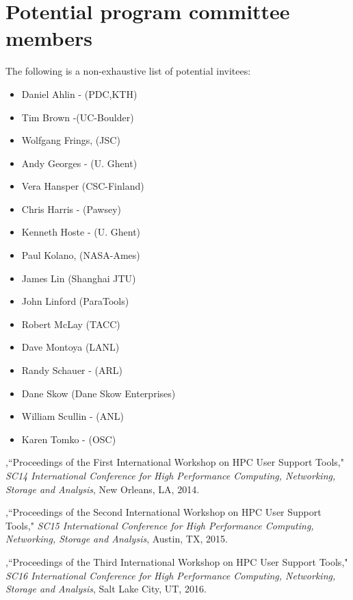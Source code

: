 \documentclass[a4paper,10pt]{article}
\begin{document}
\section*{Potential program committee members}
The following is a non-exhaustive list of potential invitees:
  \begin{multicols}{3}\footnotesize
    \begin{itemize}
        \item Daniel Ahlin - (PDC,KTH)
        \item Tim Brown -(UC-Boulder)
        \item Wolfgang Frings, (JSC)
        \item Andy Georges - (U. Ghent)        
	\item Vera Hansper (CSC-Finland)
        \item Chris Harris - (Pawsey)
        \item Kenneth Hoste - (U. Ghent)
	\item Paul Kolano, (NASA-Ames)
        \item James Lin (Shanghai JTU)
        \item John Linford (ParaTools)
        \item Robert McLay (TACC)
        \item Dave Montoya (LANL)
 	\item Randy Schauer - (ARL)
        \item Dane Skow (Dane Skow Enterprises)       
        \item William Scullin - (ANL)
	\item Karen Tomko - (OSC)
    \end{itemize}
  \end{multicols}



\begin{thebibliography}{3}

,``Proceedings of the First International Workshop on HPC User Support Tools," \emph{ SC14 International Conference for High Performance Computing, Networking, Storage and Analysis}, New Orleans, LA, 2014.

,``Proceedings of the Second International Workshop on HPC User Support Tools," \emph{ SC15 International Conference for High Performance Computing, Networking, Storage and Analysis}, Austin, TX, 2015.

,``Proceedings of the Third International Workshop on HPC User Support Tools," \emph{ SC16 International Conference for High Performance Computing, Networking, Storage and Analysis}, Salt Lake City, UT, 2016.

\end{thebibliography}
\end{document}
